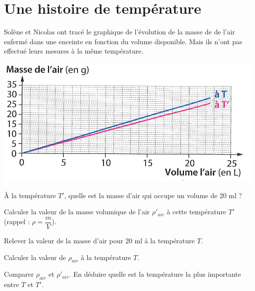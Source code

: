 \section{Une histoire de température}

Solène et Nicolas ont tracé le graphique de l'évolution de la masse de de l'air enfermé dans une enceinte en fonction du volume disponible. Mais ils n'ont pas effectué leurs mesures à la même température.

\begin{center}
	\includegraphics[scale=0.5]{masse}
\end{center}

\begin{questions}
	\question \`A la température $T'$, quelle est la masse d'air qui occupe un volume de 20 ml ?
	\fillwithdottedlines{2cm}
	
	\question Calculer la valeur de la masse volumique de l'air $\rho '_{air} $ à cette température $T'$ (rappel : $\rho = \dfrac{m}{V}$).
	\fillwithdottedlines{3cm}
	
	\question Relever la valeur de la masse d'air pour 20 ml  à la température $T$.
	
	\fillwithdottedlines{2cm}
	
	\question Calculer la valeur de $\rho_{air} $ à la température $T$.
	
	\fillwithdottedlines{3cm}
	
	
	\newpage
	
	\question Comparer $\rho_{air}$ et $\rho'_{air}$. En déduire quelle est la température la plus importante entre $T$ et $T'$.
	
	\fillwithdottedlines{4cm}
	
	
\end{questions}

